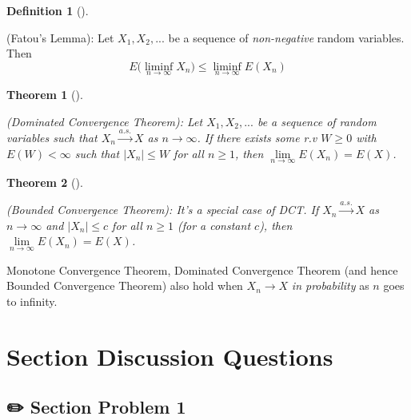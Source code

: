 \documentclass[
  letterpaper,
  DIV=11,
  numbers=noendperiod]{scrreprt}
\theoremstyle{plain}
\newtheorem{theorem}{Theorem}[chapter]
\theoremstyle{definition}
\newtheorem{definition}{Definition}[chapter]
\theoremstyle{remark}
\begin{document}
\leavevmode{}%
\begin{definition}[]\label{def-Fatou-Lemma}

(Fatou's Lemma): Let \(X_1,X_2,...\) be a sequence of
\textit{non-negative} random variables. Then
\[E\Big(  \liminf_{n\to \infty} X_n \Big) \leq \liminf_{n\to \infty} E(X_n)\]

\end{definition}

\leavevmode{}%
\begin{theorem}[]\label{thm-Dominated-Convergence-Theorem}

(Dominated Convergence Theorem): Let \(X_1,X_2,...\) be a sequence of
random variables such that \(X_n \xrightarrow{a.s.} X\) as
\(n\to \infty\). If there exists some r.v \(W\geq 0\) with
\(E(W)<\infty\) such that \(|X_n|\leq W\) for all \(n\geq 1\), then
\(\lim\limits_{n\to \infty}E(X_n) = E(X)\).

\end{theorem}

\leavevmode{}%
\begin{theorem}[]\label{thm-Bounded-Convergence-Theorem}

(Bounded Convergence Theorem): It's a special case of DCT. If
\(X_n \xrightarrow{a.s.} X\) as \(n\to \infty\) and \(|X_n|\leq c\) for
all \(n\geq 1\) (for a constant \(c\)), then
\(\lim\limits_{n\to \infty}E(X_n) = E(X)\).

\end{theorem}

Monotone Convergence Theorem, Dominated Convergence Theorem (and hence
Bounded Convergence Theorem) also hold when \(X_n \to X\)
\textit{in probability} as \(n\) goes to infinity.

\hypertarget{section-discussion-questions-2}{%
\section*{Section Discussion
Questions}\label{section-discussion-questions-2}}


\hypertarget{section-problem-1-3}{%
\subsection*{✏️ Section Problem 1}\label{section-problem-1-3}}
\end{document}

